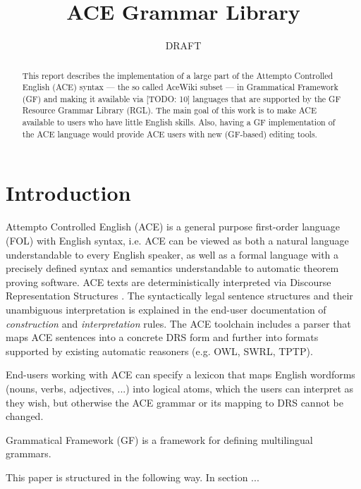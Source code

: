 \documentclass[a4paper]{article}
\newcommand\ace{Attempto Controlled English}
\begin{document}
\title{ACE Grammar Library}
\author{DRAFT}


\maketitle
\begin{abstract}
This report describes the implementation of a large part of the
Attempto Controlled English (ACE) syntax --- the so called AceWiki subset ---
in Grammatical Framework (GF) and making it available via [TODO: 10]
languages that are supported by the GF Resource Grammar Library (RGL).
The main goal of this work is to make ACE available to users who have little
English skills. Also, having a GF implementation of the ACE language would 
provide ACE users with new (GF-based) editing tools.
\end{abstract}

\section{Introduction}

\ace{} (ACE) \cite{fuchs:reasoningweb2008}
is a general purpose
first-order language (FOL)
with English syntax,
i.e. ACE can be viewed as both a natural language understandable to every
English speaker, as well as a formal language with a precisely defined
syntax and semantics understandable to automatic theorem proving software.
ACE texts are deterministically interpreted
via Discourse Representation Structures \cite{kamp:drt1993}.
The syntactically legal sentence structures and their
unambiguous interpretation is explained in the end-user documentation of
\emph{construction} and \emph{interpretation} rules.
The ACE toolchain includes a parser that maps ACE sentences into a concrete
DRS form \cite{ifi-2010.0010} and further into formats supported by existing
automatic reasoners (e.g. OWL, SWRL, TPTP).

End-users working with ACE can specify a lexicon that maps English
wordforms (nouns, verbs, adjectives, ...) into logical atoms, which the users
can interpret as they wish, but otherwise the ACE grammar or its mapping to
DRS cannot be changed.

Grammatical Framework (GF) \cite{ranta:book2011}
is a framework for defining multilingual grammars.

This paper is structured in the following way. In section ...
\end{document}
